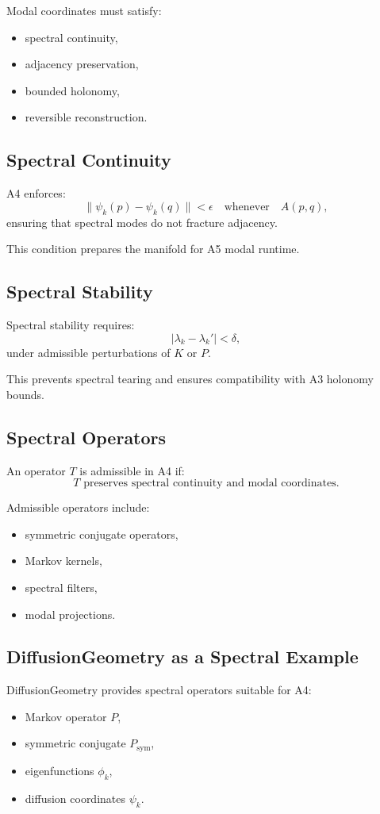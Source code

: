 Modal coordinates must satisfy:
\begin{itemize}
  \item spectral continuity,
  \item adjacency preservation,
  \item bounded holonomy,
  \item reversible reconstruction.
\end{itemize}

\subsection{Spectral Continuity}

A4 enforces:
\[
\| \psi_k(p) - \psi_k(q) \| < \epsilon \quad \text{whenever} \quad A(p,q),
\]
ensuring that spectral modes do not fracture adjacency.

This condition prepares the manifold for A5 modal runtime.

\subsection{Spectral Stability}

Spectral stability requires:
\[
|\lambda_k - \lambda_k'| < \delta,
\]
under admissible perturbations of $K$ or $P$.

This prevents spectral tearing and ensures compatibility with A3 holonomy bounds.

\subsection{Spectral Operators}

An operator $T$ is admissible in A4 if:
\[
T \text{ preserves spectral continuity and modal coordinates}.
\]

Admissible operators include:
\begin{itemize}
  \item symmetric conjugate operators,
  \item Markov kernels,
  \item spectral filters,
  \item modal projections.
\end{itemize}

\subsection{DiffusionGeometry as a Spectral Example}

DiffusionGeometry provides spectral operators suitable for A4:
\begin{itemize}
  \item Markov operator $P$,
  \item symmetric conjugate $P_{\mathrm{sym}}$,
  \item eigenfunctions $\phi_k$,
  \item diffusion coordinates $\psi_k$.
\end{itemize}

